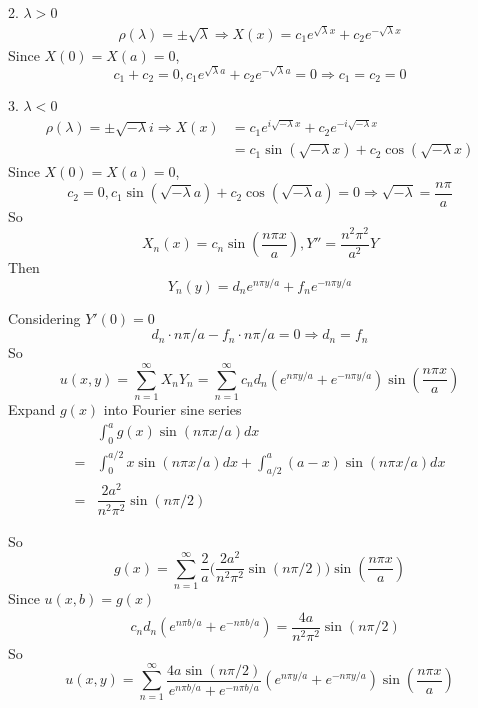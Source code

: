 \documentclass{beamer}
\begin{document}
\begin{frame}
\begin{block}{2. $\lambda>0$}
\begin{align*}
\rho(\lambda)=\pm\sqrt{\lambda}\Rightarrow X(x)=c_1e^{\sqrt{\lambda}x}+c_2e^{-\sqrt{\lambda}x}
\end{align*}
Since $X(0)=X(a)=0$, 
$$c_1+c_2=0,c_1e^{\sqrt{\lambda}a}+c_2e^{-\sqrt{\lambda}a}=0\Rightarrow c_1=c_2=0$$
\end{block}

\end{frame}
\begin{frame}
\begin{block}{3. $\lambda<0$}
\begin{align*}
\rho(\lambda)=\pm\sqrt{-\lambda}i\Rightarrow X(x)&=c_1e^{i\sqrt{-\lambda}x}+c_2e^{-i\sqrt{-\lambda}x}\\
&=c_1\sin(\sqrt{-\lambda}x)+c_2\cos(\sqrt{-\lambda}x)
\end{align*}
Since $X(0)=X(a)=0$, 
$$c_2=0,c_1\sin(\sqrt{-\lambda}a)+c_2\cos(\sqrt{-\lambda}a)=0\Rightarrow \sqrt{-\lambda}=\dfrac{n\pi}{a}$$
So 
$$X_n(x)=c_n\sin(\dfrac{n\pi x}{a}),Y''=\dfrac{n^2\pi^2}{a^2}Y$$
Then
$$Y_n(y)=d_ne^{n\pi y/a}+f_ne^{-n\pi y/a}$$
\end{block}
\end{frame}
\begin{frame}
Considering $Y'(0)=0$
$$d_n\cdot n\pi/a-f_n\cdot n\pi/a=0\Rightarrow d_n=f_n$$
So
$$u(x,y)=\sum\limits_{n=1}^{\infty}X_nY_n=\sum\limits_{n=1}^{\infty}c_nd_n(e^{n\pi y/a}+e^{-n\pi y/a})\sin(\dfrac{n\pi x}{a})$$
Expand $g(x)$ into Fourier sine series
\begin{align*}
&\int_0^ag(x)\sin (n\pi x/a)dx\\
=&\int_0^{a/2}x\sin(n\pi x/a)dx+\int_{a/2}^a(a-x)\sin(n\pi x/a)dx\\
=&\dfrac{2a^2}{n^2\pi^2}\sin(n\pi/2)
\end{align*}
\end{frame}
\begin{frame}
So 
$$g(x)=\sum\limits_{n=1}^{\infty}\dfrac{2}{a}\Bigg(\dfrac{2a^2}{n^2\pi^2}\sin(n\pi/2)\Bigg)\sin(\dfrac{n\pi x}{a})$$
Since $u(x,b)=g(x)$
\begin{align*}
&c_nd_n(e^{n\pi b/a}+e^{-n\pi b/a})=\dfrac{4a}{n^2\pi^2}\sin(n\pi/2)
\end{align*}
So $$u(x,y)=\sum\limits_{n=1}^{\infty}\dfrac{4a\sin(n\pi/2)}{e^{n\pi b/a}+e^{-n\pi b/a}}(e^{n\pi y/a}+e^{-n\pi y/a})\sin(\dfrac{n\pi x}{a})$$
\end{frame}
\end{document}
